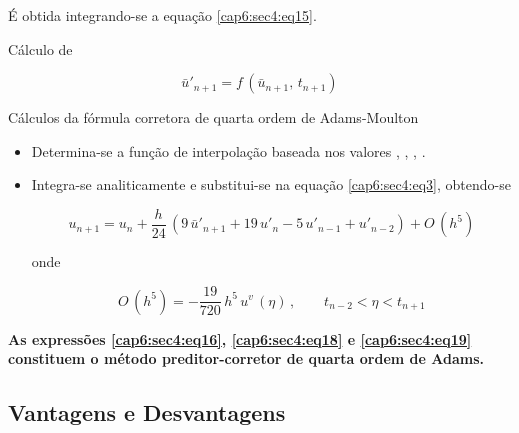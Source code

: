 \begin{enumerar}
É obtida integrando-se a equação \ref{cap6:sec4:eq15}.

\item Cálculo de 

\begin{equation}
 \label{cap6:sec4:eq18}
 \bar{u}'_{n+1} = f \, (\bar{u}_{n+1}, \, t_{n+1})
\end{equation}

\item Cálculos da fórmula corretora de quarta ordem de Adams-Moulton

\begin{itemize}

\item Determina-se a função de interpolação  baseada nos valores , , , .

\item Integra-se  analiticamente e substitui-se na equação \ref{cap6:sec4:eq3}, obtendo-se

\begin{equation}
 \label{cap6:sec4:eq19}
 u_{n+1} = u_n + \frac{h}{24} \, \left( 9 \, \bar{u}'_{n+1} + 19 \, u'_n - 5 \, u'_{n-1} + u'_{n-2} \right) + O \, (h^5)
\end{equation}

onde

\begin{equation}
 \label{cap6:sec4:eq20}
 O \, (h^5) = - \frac{19}{720} \, h^5 \, u^v \, (\eta) \, , \qquad t_{n-2} < \eta < t_{n+1}
\end{equation}

\end{itemize}

\textbf{As expressões \ref{cap6:sec4:eq16}, \ref{cap6:sec4:eq18} e \ref{cap6:sec4:eq19} constituem o método preditor-corretor de quarta ordem de Adams.}

\end{enumerar}

\subsection{Vantagens e Desvantagens}

